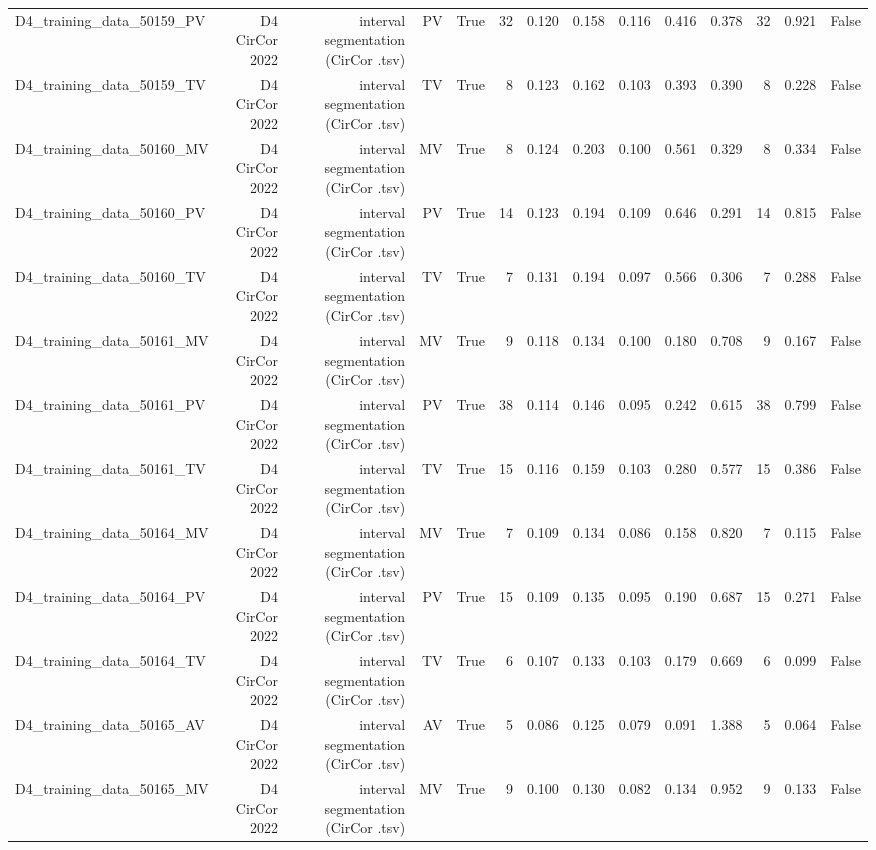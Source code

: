 \begin{table}[htbp]
\begin{tabular}{lrrrrrrrrrrrrr}
    D4\_training\_data\_50159\_PV & D4 CirCor 2022 & interval segmentation (CirCor .tsv) & PV & True & 32 & 0.120 & 0.158 & 0.116 & 0.416 & 0.378 & 32 & 0.921 & False \\
    D4\_training\_data\_50159\_TV & D4 CirCor 2022 & interval segmentation (CirCor .tsv) & TV & True & 8 & 0.123 & 0.162 & 0.103 & 0.393 & 0.390 & 8 & 0.228 & False \\
    D4\_training\_data\_50160\_MV & D4 CirCor 2022 & interval segmentation (CirCor .tsv) & MV & True & 8 & 0.124 & 0.203 & 0.100 & 0.561 & 0.329 & 8 & 0.334 & False \\
    D4\_training\_data\_50160\_PV & D4 CirCor 2022 & interval segmentation (CirCor .tsv) & PV & True & 14 & 0.123 & 0.194 & 0.109 & 0.646 & 0.291 & 14 & 0.815 & False \\
    D4\_training\_data\_50160\_TV & D4 CirCor 2022 & interval segmentation (CirCor .tsv) & TV & True & 7 & 0.131 & 0.194 & 0.097 & 0.566 & 0.306 & 7 & 0.288 & False \\
    D4\_training\_data\_50161\_MV & D4 CirCor 2022 & interval segmentation (CirCor .tsv) & MV & True & 9 & 0.118 & 0.134 & 0.100 & 0.180 & 0.708 & 9 & 0.167 & False \\
    D4\_training\_data\_50161\_PV & D4 CirCor 2022 & interval segmentation (CirCor .tsv) & PV & True & 38 & 0.114 & 0.146 & 0.095 & 0.242 & 0.615 & 38 & 0.799 & False \\
    D4\_training\_data\_50161\_TV & D4 CirCor 2022 & interval segmentation (CirCor .tsv) & TV & True & 15 & 0.116 & 0.159 & 0.103 & 0.280 & 0.577 & 15 & 0.386 & False \\
    D4\_training\_data\_50164\_MV & D4 CirCor 2022 & interval segmentation (CirCor .tsv) & MV & True & 7 & 0.109 & 0.134 & 0.086 & 0.158 & 0.820 & 7 & 0.115 & False \\
    D4\_training\_data\_50164\_PV & D4 CirCor 2022 & interval segmentation (CirCor .tsv) & PV & True & 15 & 0.109 & 0.135 & 0.095 & 0.190 & 0.687 & 15 & 0.271 & False \\
    D4\_training\_data\_50164\_TV & D4 CirCor 2022 & interval segmentation (CirCor .tsv) & TV & True & 6 & 0.107 & 0.133 & 0.103 & 0.179 & 0.669 & 6 & 0.099 & False \\
    D4\_training\_data\_50165\_AV & D4 CirCor 2022 & interval segmentation (CirCor .tsv) & AV & True & 5 & 0.086 & 0.125 & 0.079 & 0.091 & 1.388 & 5 & 0.064 & False \\
    D4\_training\_data\_50165\_MV & D4 CirCor 2022 & interval segmentation (CirCor .tsv) & MV & True & 9 & 0.100 & 0.130 & 0.082 & 0.134 & 0.952 & 9 & 0.133 & False \\

\end{tabular}
\end{table}
